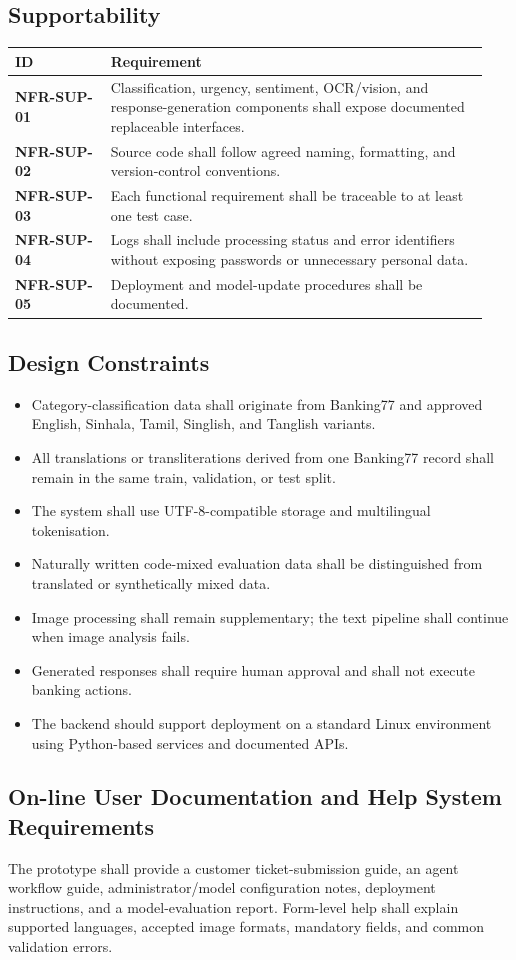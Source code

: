 \documentclass[10pt,letterpaper]{article}
\newcommand{\req}[1]{\textbf{#1}}
\newenvironment{requirements}{%
  \small\setlength{\tabcolsep}{4pt}%
  \begin{longtable}{|L{0.19\linewidth}|L{0.75\linewidth}|}
  \hline\textbf{ID} & \textbf{Requirement}\\\hline\endhead}{\hline\end{longtable}}
\newenvironment{templatebody}{\par\justifying\setlength{\emergencystretch}{3em}}{\par}
\begin{document}
\begin{templatebody}
\subsection{Supportability}
\begin{requirements}
\req{NFR-SUP-01} & Classification, urgency, sentiment, OCR/vision, and response-generation components shall expose documented replaceable interfaces.\\
\req{NFR-SUP-02} & Source code shall follow agreed naming, formatting, and version-control conventions.\\
\req{NFR-SUP-03} & Each functional requirement shall be traceable to at least one test case.\\
\req{NFR-SUP-04} & Logs shall include processing status and error identifiers without exposing passwords or unnecessary personal data.\\
\req{NFR-SUP-05} & Deployment and model-update procedures shall be documented.\\
\end{requirements}

\subsection{Design Constraints}
\begin{itemize}
    \item Category-classification data shall originate from Banking77 and approved English, Sinhala, Tamil, Singlish, and Tanglish variants.
    \item All translations or transliterations derived from one Banking77 record shall remain in the same train, validation, or test split.
    \item The system shall use UTF-8-compatible storage and multilingual tokenisation.
    \item Naturally written code-mixed evaluation data shall be distinguished from translated or synthetically mixed data.
    \item Image processing shall remain supplementary; the text pipeline shall continue when image analysis fails.
    \item Generated responses shall require human approval and shall not execute banking actions.
    \item The backend should support deployment on a standard Linux environment using Python-based services and documented APIs.
\end{itemize}

\subsection{On-line User Documentation and Help System Requirements}
The prototype shall provide a customer ticket-submission guide, an agent workflow guide, administrator/model configuration notes, deployment instructions, and a model-evaluation report. Form-level help shall explain supported languages, accepted image formats, mandatory fields, and common validation errors.


\end{templatebody}
\end{document}
